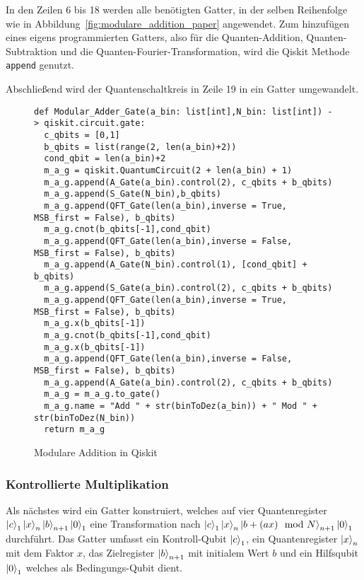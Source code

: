 In den Zeilen 6 bis 18 werden alle benötigten Gatter, 
in der selben Reihenfolge wie in Abbildung~\ref{fig:modulare_addition_paper} angewendet.
Zum hinzufügen eines eigens programmierten Gatters, 
also für die Quanten-Addition, Quanten-Subtraktion und die Quanten-Fourier-Transformation,
wird die Qiskit Methode \texttt{append} genutzt.

Abschließend wird der Quantenschaltkreis in Zeile 19 in ein Gatter umgewandelt.

\begin{figure}[H]
  \caption{Modulare Addition in Qiskit}
  \label{code:ModularAddition}
\begin{verbatim}    
def Modular_Adder_Gate(a_bin: list[int],N_bin: list[int]) -> qiskit.circuit.gate:
  c_qbits = [0,1]
  b_qbits = list(range(2, len(a_bin)+2))
  cond_qbit = len(a_bin)+2
  m_a_g = qiskit.QuantumCircuit(2 + len(a_bin) + 1) 
  m_a_g.append(A_Gate(a_bin).control(2), c_qbits + b_qbits)
  m_a_g.append(S_Gate(N_bin),b_qbits)
  m_a_g.append(QFT_Gate(len(a_bin),inverse = True, MSB_first = False), b_qbits)
  m_a_g.cnot(b_qbits[-1],cond_qbit)
  m_a_g.append(QFT_Gate(len(a_bin),inverse = False, MSB_first = False), b_qbits)
  m_a_g.append(A_Gate(N_bin).control(1), [cond_qbit] + b_qbits)
  m_a_g.append(S_Gate(a_bin).control(2), c_qbits + b_qbits)
  m_a_g.append(QFT_Gate(len(a_bin),inverse = True, MSB_first = False), b_qbits)
  m_a_g.x(b_qbits[-1])
  m_a_g.cnot(b_qbits[-1],cond_qbit)
  m_a_g.x(b_qbits[-1])
  m_a_g.append(QFT_Gate(len(a_bin),inverse = False, MSB_first = False), b_qbits)
  m_a_g.append(A_Gate(a_bin).control(2), c_qbits + b_qbits)
  m_a_g = m_a_g.to_gate()
  m_a_g.name = "Add " + str(binToDez(a_bin)) + " Mod " + str(binToDez(N_bin))
  return m_a_g
  \end{verbatim}
\end{figure}

\subsubsection{Kontrollierte Multiplikation}
Als nächstes wird ein Gatter konstruiert, welches auf vier Quantenregister \(\ket{c}_1\ket{x}_{n}\ket{b}_{n+1}\ket{0}_1\)
eine Transformation nach \(\ket{c}_1\ket{x}_{n}\ket{b + (ax)\mod N}_{n+1}\ket{0}_1\) durchführt.
Das Gatter umfasst ein Kontroll-Qubit \(\ket{c}_1\), 
ein Quantenregister \(\ket{x}_{n}\) mit dem Faktor \(x\),
das Zielregister \(\ket{b}_{n+1}\) mit initialem Wert \(b\) und 
ein Hilfsqubit \(\ket{0}_1\) welches als Bedingungs-Qubit dient.

